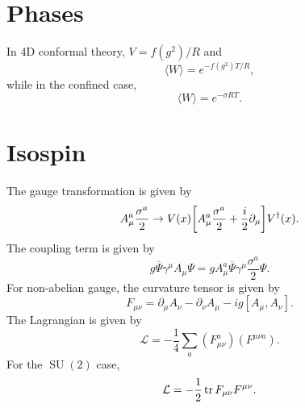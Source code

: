 \documentclass{article}
\begin{document}
\section{Phases}

In 4D conformal theory, $V = f(g^2)/R$ and
\[ \langle W \rangle = e^{-f(g^2)T/R}, \]
while in the confined case,
\[ \langle W \rangle = e^{-\sigma R T}. \]

\section{Isospin}

The gauge transformation is given by
\[ A^a_\mu \frac{\sigma^a}{2} \rightarrow V(x)\qty[A^a_\mu \frac{\sigma^a}{2} + \frac{i}{2}\partial_\mu] V^\dagger(x). \]
The coupling term is given by
\[ g\overline{\Psi} \gamma^\mu A_\mu \Psi = g A^a_\mu \overline{\Psi} \gamma^\mu \frac{\sigma^a}{2} \Psi. \]
For non-abelian gauge, the curvature tensor is given by
\[ F_{\mu\nu} = \partial_\mu A_\nu - \partial_\nu A_\mu - ig[A_\mu,A_\nu]. \]
The Lagrangian is given by
\[ \mathcal{L} = -\frac{1}{4} \sum_a (F^a_{\mu\nu})(F^{\mu\nu a}). \]
For the $\operatorname{SU}(2)$ case,
\[ \mathcal{L} = -\frac{1}{2}\tr F_{\mu\nu} F^{\mu\nu}. \]

% 
% 
\end{document}
